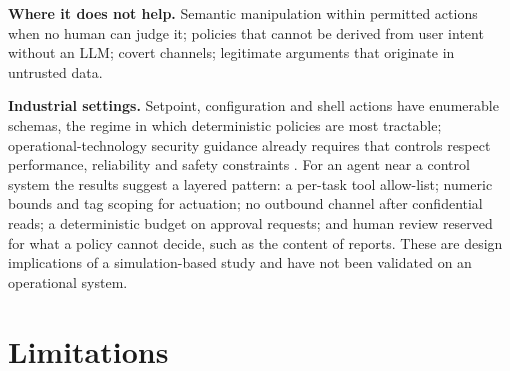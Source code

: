 \documentclass[11pt]{article}
\begin{document}
\textbf{Where it does not help.} Semantic manipulation within permitted actions when no human can judge it; policies that cannot be derived from user intent without an LLM; covert channels; legitimate arguments that originate in untrusted data.

\textbf{Industrial settings.} Setpoint, configuration and shell actions have enumerable schemas, the regime in which deterministic policies are most tractable; operational-technology security guidance already requires that controls respect performance, reliability and safety constraints \cite{nist80082}. For an agent near a control system the results suggest a layered pattern: a per-task tool allow-list; numeric bounds and tag scoping for actuation; no outbound channel after confidential reads; a deterministic budget on approval requests; and human review reserved for what a policy cannot decide, such as the content of reports. These are design implications of a simulation-based study and have not been validated on an operational system.

\hypertarget{limitations}{%
\FloatBarrier
\section{Limitations}\label{limitations}}
\end{document}
